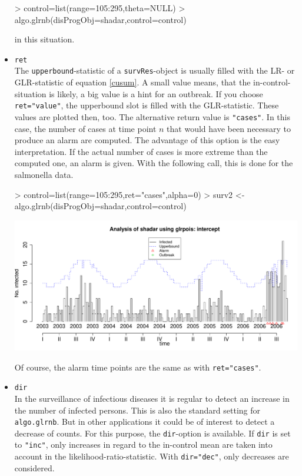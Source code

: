 \documentclass[a4paper,11pt]{article}
\begin{document}
\begin{itemize}
\begin{Schunk}
\begin{Sinput}
> control=list(range=105:295,theta=NULL)
> algo.glrnb(disProgObj=shadar,control=control)
\end{Sinput}
\end{Schunk}

in this situation.

\item \verb+ret+ \\
The \verb+upperbound+-statistic of a \verb+survRes+-object is usually filled with the LR- or GLR-statistic of equation \ref{cusum}. A small value means, that the in-control-situation is likely, a big value is a hint for an outbreak. If you choose \verb+ret="value"+, the upperbound slot is filled with the GLR-statistic. These values are plotted then, too. The alternative return value is \verb+"cases"+. In this case, the number of cases at time point $n$ that would have been necessary to produce an alarm are computed. The advantage of this option is the easy interpretation. If the actual number of cases is more extreme than the computed one, an alarm is given. With the following call, this is done for the salmonella data.

\begin{Schunk}
\begin{Sinput}
> control=list(range=105:295,ret="cases",alpha=0)
> surv2 <- algo.glrnb(disProgObj=shadar,control=control)
\end{Sinput}
\end{Schunk}

\includegraphics{figs/vignette_glrnb-021}

Of course, the alarm time points are the same as with \verb+ret="cases"+.

\item \verb+dir+ \\
In the surveillance of infectious diseases it is regular to detect an increase in the number of infected persons. This is also the standard setting for \verb+algo.glrnb+. But in other applications it could be of interest to detect a decrease of counts. For this purpose, the \verb+dir+-option is available. If \verb+dir+ is set to \verb+"inc"+, only increases in regard to the in-control mean are taken into account in the likelihood-ratio-statistic. With \verb+dir="dec"+, only decreases are considered.


\end{itemize}
\end{document}
